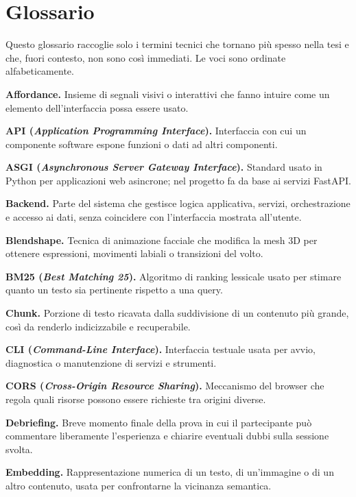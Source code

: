 \chapter*{Glossario}
\label{app:glossary}

\begingroup
\small
\setlength{\parindent}{0pt}
\setlength{\parskip}{0.65em}

Questo glossario raccoglie solo i termini tecnici che tornano più spesso nella tesi e che, fuori contesto, non sono così immediati. Le voci sono ordinate alfabeticamente.

\textbf{Affordance.} Insieme di segnali visivi o interattivi che fanno intuire come un elemento dell'interfaccia possa essere usato.

\textbf{API (\emph{Application Programming Interface}).} Interfaccia con cui un componente software espone funzioni o dati ad altri componenti.

\textbf{ASGI (\emph{Asynchronous Server Gateway Interface}).} Standard usato in Python per applicazioni web asincrone; nel progetto fa da base ai servizi FastAPI.

\textbf{Backend.} Parte del sistema che gestisce logica applicativa, servizi, orchestrazione e accesso ai dati, senza coincidere con l'interfaccia mostrata all'utente.

\textbf{Blendshape.} Tecnica di animazione facciale che modifica la mesh 3D per ottenere espressioni, movimenti labiali o transizioni del volto.

\textbf{BM25 (\emph{Best Matching 25}).} Algoritmo di ranking lessicale usato per stimare quanto un testo sia pertinente rispetto a una query.

\textbf{Chunk.} Porzione di testo ricavata dalla suddivisione di un contenuto più grande, così da renderlo indicizzabile e recuperabile.

\textbf{CLI (\emph{Command-Line Interface}).} Interfaccia testuale usata per avvio, diagnostica o manutenzione di servizi e strumenti.

\textbf{CORS (\emph{Cross-Origin Resource Sharing}).} Meccanismo del browser che regola quali risorse possono essere richieste tra origini diverse.

\textbf{Debriefing.} Breve momento finale della prova in cui il partecipante può commentare liberamente l'esperienza e chiarire eventuali dubbi sulla sessione svolta.

\textbf{Embedding.} Rappresentazione numerica di un testo, di un'immagine o di un altro contenuto, usata per confrontarne la vicinanza semantica.

